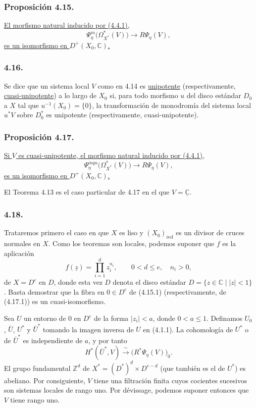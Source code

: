 \subsubsection*{Proposición 4.15.}
\underline{El morfismo natural inducido por (4.4.1),}
\begin{equation}\tag{4.15.1}
\Psi_\eta^m\bigl(\Omega_{X^*}^*(V)\bigr)
\longrightarrow R\Psi_\eta(V),
\end{equation}
\underline{es un isomorfismo en $D^+(X_0,\mathbb C)$.}

\subsubsection*{4.16.}
Se dice que un sistema local $V$ como en 4.14 es
\underline{unipotente} (respectivamente, \underline{cuasi-unipotente})
a lo largo de $X_0$ si, para todo morfismo $u$ del disco estándar $D_0$
a $X$ tal que $u^{-1}(X_0)=\{0\}$, la transformación de monodromía del
sistema local $u^*V$ sobre $D_0^*$ es unipotente (respectivamente,
cuasi-unipotente).

\subsubsection*{Proposición 4.17.}
\underline{Si $V$ es cuasi-unipotente, el morfismo natural inducido por
(4.4.1),}
\begin{equation}\tag{4.17.1}
\Psi_\eta^{mqu}\bigl(\Omega_{X^*}^*(V)\bigr)
\longrightarrow R\Psi_\eta(V),
\end{equation}
\underline{es un isomorfismo en $D^+(X_0,\mathbb C)$.}

\pageoriginale

El Teorema 4.13 es el caso particular de 4.17 en el que
$V=\underline{\mathbb C}$.

\subsubsection*{4.18.}
Trataremos primero el caso en que $X$ es liso y $(X_0)_{\mathrm{red}}$
es un divisor de cruces normales en $X$. Como los teoremas son locales,
podemos suponer que $f$ es la aplicación
\[
f(\underline z)=\prod_{i=1}^d z_i^{n_i},
\qquad 0<d\leq e,\quad n_i>0,
\]
de $X=D^e$ en $D$, donde esta vez $D$ denota el disco estándar
$D=\{z\in\mathbb C\mid |z|<1\}$. Basta demostrar que la fibra en
$0\in D^e$ de (4.15.1) (respectivamente, de (4.17.1)) es un
cuasi-isomorfismo.

Sea $U$ un entorno de $0$ en $D^e$ de la forma $|z_i|<a$, donde
$0<a\leq1$. Definamos $U_0$, $\bar U$, $U^*$ y $\bar U^*$ tomando la
imagen inversa de $U$ en (4.1.1). La cohomología de $U^*$ o de
$\bar U^*$ es independiente de $a$, y por tanto
\[
H^*(\bar U^*,V)\xrightarrow{\ \sim\ }
  \bigl(R^*\Psi_\eta(V)\bigr)_0.
\]
El grupo fundamental $\mathbb Z^d$ de
$X^*=(D^*)^d\times D^{e-d}$ (que también es el de $U^*$) es abeliano.
Por consiguiente, $V$ tiene una filtración finita cuyos cocientes
sucesivos son sistemas locales de rango uno. Por dévissage, podemos
suponer entonces que $V$ tiene rango uno.

